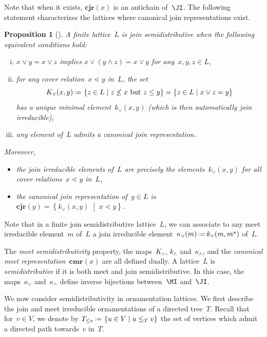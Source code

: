 \documentclass{amsart}
\newtheorem{proposition}[theorem]{Proposition}
\theoremstyle{definition}
\newcommand{\set}[2]{\left\{ #1 \;\middle|\; #2 \right\}} %
\newcommand{\eqdef}{\mbox{\,\raisebox{0.2ex}{\scriptsize\ensuremath{\mathrm:}}\ensuremath{=}\,}} %
\newcommand{\darkblue}{\color{darkblue}} %
\newcommand{\defn}[1]{\textsl{\darkblue #1}} %
\newcommand{\meet}{\wedge} %
\newcommand{\join}{\vee} %
\newcommand{\CJR}{\mathbf{cjr}} %
\newcommand{\CMR}{\mathbf{cmr}} %
\newcommand{\lessin}[2]{#1_{\le#2}} %
\begin{document}
Note that when it exists, $\CJR(x)$ is an antichain of~$\JI$.
The following statement characterizes the lattices where canonical join representations exist.

\begin{proposition}[{\cite[Thm.~2.24 \& Thm.~2.56]{FreeseNation}}]
\label{prop:semidistributive}
A finite lattice~$L$ is \defn{join semidistributive} when the following equivalent conditions hold:
\begin{enumerate}[(i)]
\item $x \join y = x \join z$ implies $x \join (y \meet z) = x \join y$ for any~$x, y, z \in L$,
\item for any cover relation~$x \lessdot y$ in~$L$, the set \[K_\join(x,y) \eqdef \set{z \in L}{z \not\le x \text{ but } z \le y} = \set{z \in L}{x \join z = y}\] has a unique minimal element~$k_\join(x,y)$ (which is then automatically join irreducible),
\item any element of~$L$ admits a canonical join representation.
\end{enumerate}
Moreover, 
\begin{itemize}
\item the join irreducible elements of~$L$ are precisely the elements~$k_\join(x,y)$ for all cover relations~$x \lessdot y$ in~$L$,
\item the canonical join representation of~$y \in L$ is~$\CJR(y) = \set{k_\join(x, y)}{x \lessdot y}$.
\end{itemize}
\end{proposition}

Note that in a finite join semidistributive lattice~$L$, we can associate to any meet irreducible element~$m$ of~$L$ a join irreducible element~$\kappa_\join(m) \eqdef k_\join(m, m^\star)$ of~$L$.

The \defn{meet semidistributivity} property, the maps~$K_\meet$, $k_\meet$ and~$\kappa_\meet$, and the \defn{canonical meet representation}~$\CMR(x)$ are all defined dually.
A lattice~$L$ is \defn{semidistributive} if it is both meet and join semidistributive.
In this case, the maps~$\kappa_\join$ and~$\kappa_\meet$ define inverse bijections between~$\MI$ and~$\JI$.

\medskip
We now consider semidistributivity in ornamentation lattices.
We first describe the join and meet irreducible ornamentations of a directed tree~$T$.
Recall that for~$v \in V$, we denote by $\lessin{T}{v} \eqdef \set{u \in V}{u \le_T v}$ the set of vertices which admit a directed path towards~$v$ in~$T$.
\end{document}
